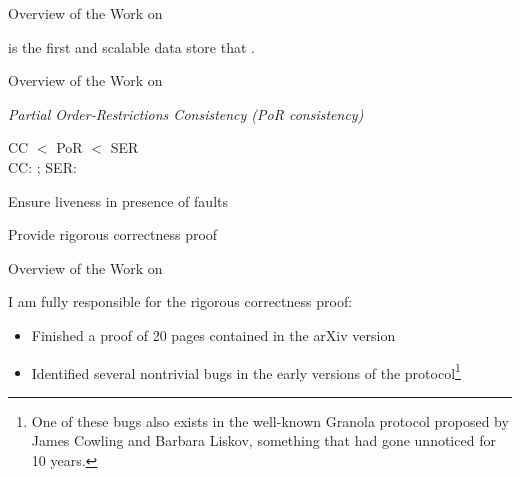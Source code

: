
\begin{frame}{Overview of the Work on \unistore}
  \begin{center}
    \vspace{0.20cm}

    \vspace{1.00cm}
    \unistore{} is the first  and scalable  data store
    that .
  \end{center}
\end{frame}

\begin{frame}{Overview of the Work on \unistore}
  \begin{center}
    {\it Partial Order-Restrictions Consistency (PoR consistency)}

    \vspace{0.30cm}
    CC $<$ PoR $<$ SER \\[6pt]
    CC: \cc; SER: \ser

    \vspace{1.20cm}
    \begin{description}
      \item[\red{Key Challenges (I):}] Ensure liveness in presence of faults \\[10pt]
      \item[\red{Key Challenges (II):}] Provide rigorous correctness proof
    \end{description}
  \end{center}
\end{frame}

\begin{frame}{Overview of the Work on \unistore}
  \begin{center}
    \vspace{0.20cm}

    \vspace{1.20cm}
    I am fully responsible for the rigorous correctness proof: \\[3pt]

    \begin{itemize}
      \item Finished a proof of 20 pages contained in the \textsf{arXiv} version
      \item Identified several nontrivial bugs
            in the early versions of the protocol\footnote{
              One of these bugs also exists in the well-known Granola protocol
              proposed by James Cowling and Barbara Liskov,
              something that had gone unnoticed for 10 years.}
    \end{itemize}
  \end{center}
\end{frame}

